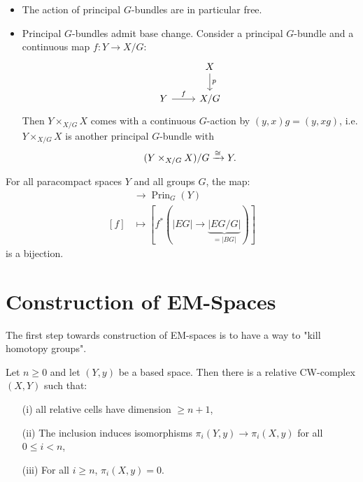\begin{itemize}[label={-}]
    \item The action of principal $G$-bundles are in particular free.
    \item Principal $G$-bundles admit base change. Consider a principal $G$-bundle and a continuous map $f:Y\to X/G$:
    \[\begin{tikzcd} & X \ar[d,"p"] \\
    Y \ar[r,"f"] & X/G\end{tikzcd}\]
    Then $Y\times_{X/G}X$ comes with a continuous $G$-action by $(y,x)g=(y,xg)$, i.e. $Y\times_{X/G}X$ is another principal $G$-bundle with \[(Y\times_{X/G}X)/G\xrightarrow{\cong} Y.\]
\end{itemize}

\begin{theorem}
For all paracompact spaces $Y$ and all groups $G$, the map:
\begin{align*}
    [Y,|BG|]&\to \operatorname{Prin}_G(Y)\\
    [f]&\mapsto[f^*(|EG|\to\underbrace{|EG/G|}_{=|BG|})]
\end{align*}
is a bijection.
\end{theorem}

\section{Construction of EM-Spaces}

The first step towards construction of EM-spaces is to have a way to "kill homotopy groups".

\begin{theorem}\label{theorem:killing-homotopy-groups}
Let $n\geq0$ and let $(Y,y)$ be a based space. Then there is a relative CW-complex $(X,Y)$ such that:
\begin{itemize}
    \item[(i)] all relative cells have dimension $\geq n+1$,
    \item[(ii)] The inclusion induces isomorphisms $\pi_i(Y,y)\to\pi_i(X,y)$ for all $0\leq i<n$,
    \item[(iii)] For all $i\geq n$, $\pi_i(X,y)=0$.
\end{itemize}
\end{theorem}

